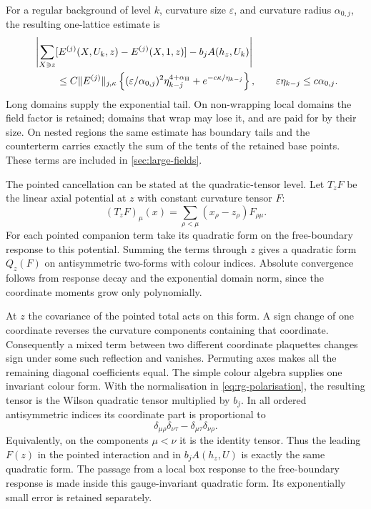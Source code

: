 \documentclass[11pt,letterpaper,reqno]{amsart}
\theoremstyle{definition}
\theoremstyle{remark}
\begin{document}
For a regular background of level $k$, curvature size
$\varepsilon$, and curvature radius $\alpha_{0,j}$, the resulting
one-lattice estimate is
\begin{align}\label{eq:rg-subtraction}
 &\left|\sum_{X\ni z}
 [E^{(j)}(X,U_k,z)-E^{(j)}(X,1,z)]
                  -b_jA(h_z,U_k)\right|\notag\\
 &\hspace{8mm}\le C\|E^{(j)}\|_{j,\kappa}
 \left\{(\varepsilon/\alpha_{0,j})^2
             \eta_{k-j}^{4+\alpha_{\mathrm H}}
                  +e^{-c\kappa/\eta_{k-j}}\right\},
 \qquad \varepsilon\eta_{k-j}\le c\alpha_{0,j}.
\end{align}
Long domains supply the exponential tail. On non-wrapping local
domains the field factor is retained; domains that wrap may lose
it, and are paid for by their size. On nested regions the same
estimate has boundary tails and the counterterm carries exactly
the sum of the tents of the retained base points. These terms
are included in \cref{sec:large-fields}.

The pointed cancellation can be stated at the
quadratic-tensor level. Let $T_zF$ be the
linear axial potential at $z$ with constant
curvature tensor $F$:
\[
 (T_zF)_\mu(x)=\sum_{\rho<\mu}(x_\rho-z_\rho)F_{\rho\mu}.
\]
For each pointed companion term take its
quadratic form on the free-boundary response
to this potential. Summing the terms through
$z$ gives a quadratic form $Q_z(F)$ on
antisymmetric two-forms with colour indices.
Absolute convergence follows from response
decay and the exponential domain norm, since
the coordinate moments grow only polynomially.

At $z$ the covariance of the pointed total
acts on this form. A sign change of one
coordinate reverses the curvature components
containing that coordinate. Consequently a
mixed term between two different coordinate
plaquettes changes sign under some such
reflection and vanishes. Permuting axes
makes all the remaining diagonal coefficients
equal. The simple colour algebra supplies
one invariant colour form. With the
normalisation in \eqref{eq:rg-polarisation},
the resulting tensor is the Wilson
quadratic tensor multiplied by $b_j$.
In all ordered antisymmetric indices its
coordinate part is proportional to
\begin{equation}\label{eq:xrg-pointed-tensor}
 \delta_{\mu\rho}\delta_{\nu\tau}
                  -\delta_{\mu\tau}\delta_{\nu\rho}.
\end{equation}
Equivalently, on the components $\mu<\nu$
it is the identity tensor. Thus the leading
$F(z)$ in the pointed interaction and in
$b_jA(h_z,U)$ is exactly the same quadratic
form. The passage from a local box response
to the free-boundary response is made inside
this gauge-invariant quadratic form. Its
exponentially small error is retained
separately.
\end{document}

